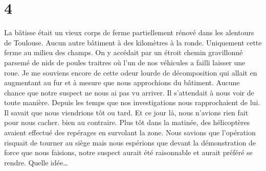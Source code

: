 \chapter*{4}
La bâtisse était un vieux corps de ferme partiellement rénové dans les
alentours de Toulouse. Aucun autre bâtiment à des kilomètres à la ronde.
Uniquement cette ferme au milieu des champs. On y accédait par un étroit chemin
gravillonné parsemé de nids de poules traitres où l’un de nos véhicules a failli
laisser une roue. Je me souviens encore de cette odeur lourde de décomposition
qui allait en augmentant au fur et à mesure que nous approchions du bâtiment.
Aucune chance que notre suspect ne nous ai pas vu arriver. Il s’attendait à
nous voir de toute manière. Depuis les temps que nos investigations nous
rapprochaient de lui. Il savait que nous viendrions tôt ou tard. Et ce jour là,
nous n’avions rien fait pour nous cacher. bien au contraire. Plus tôt dans la
matinée, des hélicoptères avaient effectué des repérages en survolant la zone.
Nous savions que l’opération risquait de tourner au siège mais nous espérions
que devant la démonstration de force que nous faisions, notre suspect aurait
été raisonnable et aurait préféré se rendre. Quelle idée…